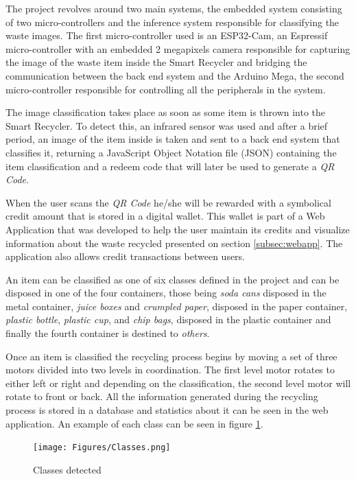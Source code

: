 \documentclass[a4paper,11pt]{article}
\begin{document}
The project revolves around two main systems, the embedded system consisting of two micro-controllers and the inference system responsible for classifying the waste images. The first micro-controller used is an ESP32-Cam, an Espressif micro-controller with an embedded 2 megapixels camera responsible for capturing the image of the waste item inside the Smart Recycler and bridging the communication between the back end system and the Arduino Mega, the second micro-controller responsible for controlling all the peripherals in the system.

The image classification takes place as soon as some item is thrown into the Smart Recycler. To detect this, an infrared sensor was used and after a brief period, an image of the item inside is taken and sent to a back end system that classifies it, returning a JavaScript Object Notation file (JSON) containing the item classification and a redeem code that will later be used to generate a \textit{QR Code}.

When the user scans the \textit{QR Code} he/she will be rewarded with a symbolical credit amount that is stored in a digital wallet. This wallet is part of a Web Application that was developed to help the user maintain its credits and visualize information about the waste recycled presented on section \ref{subsec:webapp}. The application also allows credit transactions between users.

An item can be classified as one of six classes defined in the project and can be disposed in one of the four containers, those being \textit{soda cans} disposed in the metal container, \textit{juice boxes} and \textit{crumpled paper}, disposed in the paper container, \textit{plastic bottle}, \textit{plastic cup}, and \textit{chip bags}, disposed in the plastic container and finally the fourth container is destined to \textit{others}.

Once an item is classified the recycling process begins by moving a set of three motors divided into two levels in coordination. The first level motor rotates to either left or right and depending on the classification, the second level motor will rotate to front or back. All the information generated during the recycling process is stored in a database and statistics about it can be seen in the web application. An example of each class can be seen in figure \ref{fig:classes}.

\begin{figure}[H]
  \centering
  \texttt{[image: Figures/Classes.png]}
  \caption{\small{Classes detected}}
  \label{fig:classes}
\end{figure}
\end{document}
